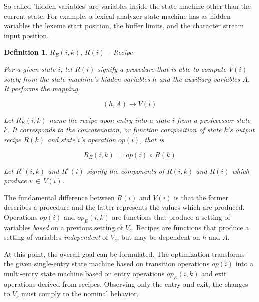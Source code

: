 \documentclass[12pt,a4paper]{scrartcl}
\newtheorem{definition}{Definition}
\begin{document}
So called 'hidden variables' are variables inside the state machine other than
the current state.  For example, a lexical analyzer state machine has as hidden
variables the lexeme start position, the buffer limits, and the character
stream input position.

\begin{definition} $R_E(i,k),\,R(i)$ -- Recipe 

For a given state $i$, let $R(i)$ signify a procedure that is able to compute
$V(i)$ solely from the state machine's hidden variables $h$ and the auxiliary
variables $A$.  It performs the mapping

\begin{equation} \label{eq:recipe-procedure}
    (h, A) \rightarrow V(i)                                             
\end{equation}

Let $R_E(i,k)$ name the recipe upon entry into a state $i$ from a predecessor
state $k$. It corresponds to the concatenation, or \textit{function
composition} of state $k$'s output recipe $R(k)$ and state $i$'s operation
$op(i)$, that is

\begin{equation} \label{eq:entry-recipe-concatenated}
    R_E(i,k) \,=\, op(i)\, \circ \, R(k)
\end{equation}

Let $R^v(i,k)$ and $R^v(i)$ signify the components of $R(i,k)$ and $R(i)$ which
produce $v\,\in\,V(i)$.  

\end{definition}

The fundamental difference between $R(i)$ and $V(i)$ is that the former
describes a procedure and the latter represents the values which are produced.
Operations $op(i)$ and $op_E(i,k)$ are functions that produce a setting of
variables \textit{based} on a previous setting of $V_c$.  Recipes are functions
that produce a setting of variables \textit{independent} of $V_c$, but may be
dependent on $h$ and $A$.

At this point, the overall goal can be formulated. The optimization transforms
the given single-entry state machine based on transition operations $op(i)$
into a multi-entry state machine based on entry operations $op_E(i,k)$ and exit
operations derived from recipes. Observing only the entry and exit, the changes
to $V_c$ must comply to the nominal behavior. 

%
\end{document}
